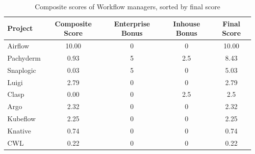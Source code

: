 \begin{table}[h!]
    \centering
    \begin{tabular}{|l|c|c|c|c|} 
    \hline
        \textbf{Project} & \textbf{Composite Score} & \textbf{Enterprise Bonus} & \textbf{Inhouse Bonus}  & \textbf{Final Score}\\
        \hline
        Airflow & 10.00 & 0 & 0 & 10.00 \\
        Pachyderm & 0.93 & 5 & 2.5 & 8.43 \\
        Snaplogic & 0.03 & 5 & 0 & 5.03 \\
        Luigi & 2.79 & 0 & 0 & 2.79 \\
        Clasp & 0.00 & 0 & 2.5 & 2.5 \\
        Argo & 2.32 & 0 & 0 & 2.32 \\
        Kubeflow & 2.25 & 0 & 0 & 2.25 \\
        Knative & 0.74 & 0 & 0 & 0.74 \\
        CWL & 0.22 & 0 & 0 & 0.22 \\
    \hline
    \end{tabular}
    \caption{Composite scores of Workflow managers, sorted by final score}
    \label{tab:results}
\end{table}


